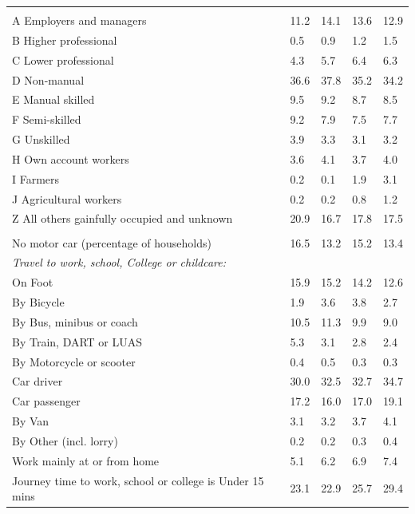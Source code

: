 \documentclass{article}
\begin{document}
\begin{table}[h]
\begin{tabular}{KTTTT}
\hline
    \\ 
    \hline
A Employers and managers & 11.2& 14.1& 13.6& 12.9\\
B Higher professional & 0.5& 0.9& 1.2& 1.5\\
C Lower professional & 4.3& 5.7& 6.4& 6.3\\
D Non-manual & 36.6& 37.8& 35.2& 34.2\\
E Manual skilled & 9.5& 9.2& 8.7& 8.5\\
F Semi-skilled & 9.2& 7.9& 7.5& 7.7\\
G Unskilled & 3.9& 3.3& 3.1& 3.2\\
H Own account workers & 3.6& 4.1& 3.7& 4.0\\
I Farmers & 0.2& 0.1& 1.9& 3.1\\
J Agricultural workers & 0.2& 0.2& 0.8& 1.2\\
Z All others gainfully occupied and unknown & 20.9& 16.7& 17.8& 17.5\\
\hline
{}\hline
    \\ 
    \hline
No motor car (percentage of households) & 16.5& 13.2& 15.2& 
13.4\\
    \hline 
\emph{Travel to work, school, College or childcare:} & & & \\
\quad On Foot & 15.9& 15.2& 14.2& 12.6\\ 
\quad By Bicycle & 1.9& 3.6& 3.8& 2.7\\ 
\quad By Bus, minibus or coach & 10.5& 11.3&  9.9&  9.0\\
\quad By Train, DART or LUAS & 5.3& 3.1& 2.8& 2.4\\
\quad By Motorcycle or scooter & 0.4& 0.5& 0.3& 0.3\\
\quad Car driver & 30.0 & 32.5& 32.7& 34.7\\
\quad Car passenger & 17.2& 16.0& 17.0& 19.1\\
\quad By Van & 3.1& 3.2& 3.7& 4.1\\
\quad By Other (incl. lorry) & 0.2& 0.2& 0.3& 0.4\\
    \hline
Work mainly at or from home & 5.1& 6.2& 6.9& 7.4\\
Journey time to work, school or college is Under 15 mins & 23.1& 22.9& 25.7& 29.4\\

\end{tabular}
\end{table}
\end{document}
